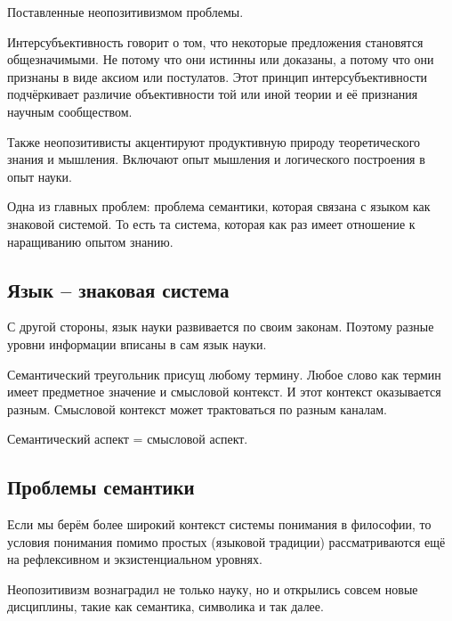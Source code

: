 \documentclass[main.tex]{subfiles}
\begin{document}
Поставленные неопозитивизмом проблемы.

Интерсубъективность говорит о том, что некоторые предложения становятся общезначимыми.
Не потому что они истинны или доказаны, а потому что они признаны в виде аксиом или постулатов.
Этот принцип интерсубъективности подчёркивает различие объективности той или иной теории и её признания научным сообществом.

Также неопозитивисты акцентируют продуктивную природу теоретического знания и мышления.
Включают опыт мышления и логического построения в опыт науки.

Одна из главных проблем: проблема семантики, которая связана с языком как знаковой системой.
То есть та система, которая как раз имеет отношение к наращиванию опытом знанию.

\subsection{Язык -- знаковая система}


С другой стороны, язык науки развивается по своим законам.
Поэтому разные уровни информации вписаны в сам язык науки.


Семантический треугольник присущ любому термину.
Любое слово как термин имеет предметное значение и смысловой контекст.
И этот контекст оказывается разным.
Смысловой контекст может трактоваться по разным каналам.

Семантический аспект = смысловой аспект.


\subsection{Проблемы семантики}


Если мы берём более широкий контекст системы понимания в философии, то условия понимания помимо простых (языковой традиции) рассматриваются ещё на рефлексивном и экзистенциальном уровнях.

Неопозитивизм вознаградил не только науку, но и открылись совсем новые дисциплины, такие как семантика, символика и так далее.
\end{document}
